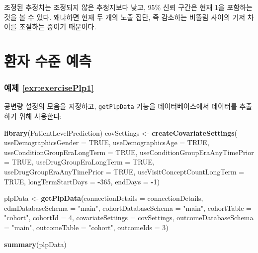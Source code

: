 \documentclass[10.5pt]{book}
\newenvironment{Shaded}{\begin{snugshade}}{\end{snugshade}}
\newcommand{\KeywordTok}[1]{\textcolor[rgb]{0.13,0.29,0.53}{\textbf{#1}}}
\newcommand{\DataTypeTok}[1]{\textcolor[rgb]{0.13,0.29,0.53}{#1}}
\newcommand{\DecValTok}[1]{\textcolor[rgb]{0.00,0.00,0.81}{#1}}
\newcommand{\StringTok}[1]{\textcolor[rgb]{0.31,0.60,0.02}{#1}}
\newcommand{\OtherTok}[1]{\textcolor[rgb]{0.56,0.35,0.01}{#1}}
\newcommand{\OperatorTok}[1]{\textcolor[rgb]{0.81,0.36,0.00}{\textbf{#1}}}
\newcommand{\NormalTok}[1]{#1}
\theoremstyle{definition}
\theoremstyle{definition}
\theoremstyle{definition}
\theoremstyle{remark}
\begin{document}
조정된 추정치는 조정되지 않은 추청지보다 낮고, 95\% 신뢰 구간은 현재 1을
포함하는 것을 볼 수 있다. 왜냐하면 현재 두 개의 노출 집단, 즉 감소하는
비뚤림 사이의 기저 차이를 조절하는 중이기 때문이다.

\section{환자 수준 예측}\label{Plpanswers}

\subsubsection*{예제 \ref{exr:exercisePlp1}}\label{-refexrexerciseplp1}

공변량 설정의 모음을 지정하고, \texttt{getPlpData} 기능을
데이터베이스에서 데이터를 추출하기 위해 사용한다:

\begin{Shaded}
\begin{Highlighting}[]
\KeywordTok{library}\NormalTok{(PatientLevelPrediction)}
\NormalTok{covSettings <-}\StringTok{ }\KeywordTok{createCovariateSettings}\NormalTok{(}
  \DataTypeTok{useDemographicsGender =} \OtherTok{TRUE}\NormalTok{,}
  \DataTypeTok{useDemographicsAge =} \OtherTok{TRUE}\NormalTok{,}
  \DataTypeTok{useConditionGroupEraLongTerm =} \OtherTok{TRUE}\NormalTok{,}
  \DataTypeTok{useConditionGroupEraAnyTimePrior =} \OtherTok{TRUE}\NormalTok{,}
  \DataTypeTok{useDrugGroupEraLongTerm =} \OtherTok{TRUE}\NormalTok{,}
  \DataTypeTok{useDrugGroupEraAnyTimePrior =} \OtherTok{TRUE}\NormalTok{,}
  \DataTypeTok{useVisitConceptCountLongTerm =} \OtherTok{TRUE}\NormalTok{,}
  \DataTypeTok{longTermStartDays =} \OperatorTok{-}\DecValTok{365}\NormalTok{,}
  \DataTypeTok{endDays =} \OperatorTok{-}\DecValTok{1}\NormalTok{)}

\NormalTok{plpData <-}\StringTok{ }\KeywordTok{getPlpData}\NormalTok{(}\DataTypeTok{connectionDetails =}\NormalTok{ connectionDetails,}
                      \DataTypeTok{cdmDatabaseSchema =} \StringTok{"main"}\NormalTok{,}
                      \DataTypeTok{cohortDatabaseSchema =} \StringTok{"main"}\NormalTok{,}
                      \DataTypeTok{cohortTable =} \StringTok{"cohort"}\NormalTok{,}
                      \DataTypeTok{cohortId =} \DecValTok{4}\NormalTok{,}
                      \DataTypeTok{covariateSettings =}\NormalTok{ covSettings,}
                      \DataTypeTok{outcomeDatabaseSchema =} \StringTok{"main"}\NormalTok{,}
                      \DataTypeTok{outcomeTable =} \StringTok{"cohort"}\NormalTok{,}
                      \DataTypeTok{outcomeIds =} \DecValTok{3}\NormalTok{)}

\KeywordTok{summary}\NormalTok{(plpData)}
\end{Highlighting}
\end{Shaded}
\end{document}
